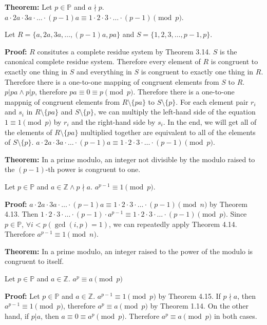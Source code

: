 \item \textbf{Theorem:} Let \(p \in \mathbb P\) and \(a \nmid p\). \(a \cdot 2a \cdot 3a \cdot \dots \cdot (p-1)a \equiv 1 \cdot 2 \cdot 3 \cdot \dots \cdot (p-1) \pmod p\).

Let \(R = \{a, 2a, 3a, \dots, (p-1)a, pa\}\) and \(S = \{1, 2, 3, \dots, p-1, p\}\).

\textbf{Proof:} \(R\) consitutes a complete residue system by Theorem 3.14. \(S\) is the canonical complete residue system. Therefore every element of \(R\) is congruent to exactly one thing in \(S\) and everything in \(S\) is congruent to exactly one thing in \(R\). Therefore there is a one-to-one mapping of congruent elements from \(S\) to \(R\). \(p|pa \wedge p|p\), therefore \(pa \equiv 0 \equiv p \pmod p\). Therefore there is a one-to-one mappnig of congruent elements from \(R \setminus \{pa\}\) to \(S \setminus \{p\}\). For each element pair \(r_i\) and \(s_i\) in \(R \setminus \{pa\}\) and \(S \setminus \{p\}\), we can multiply the left-hand side of the equation \(1 \equiv 1 \pmod p\) by \(r_i\) and the right-hand side by \(s_i\). In the end, we will get all of the elements of \(R \setminus \{pa\}\) multiplied together are equivalent to all of the elements of \(S \setminus \{p\}\). \(a \cdot 2a \cdot 3a \cdot \dots \cdot (p-1)a \equiv 1 \cdot 2 \cdot 3 \cdot \dots \cdot (p-1) \pmod p\). \qedhere

\item \textbf{Theorem:} In a prime modulo, an integer not divisible by the modulo raised to the \((p-1)\)-th power is congruent to one.

Let \(p \in \mathbb P\) and \(a \in \mathbb Z \wedge p \nmid a\). \(a^{p-1} \equiv 1 \pmod p\).

\textbf{Proof:} \(a \cdot 2a \cdot 3a \cdot \dots \cdot (p-1)a \equiv 1 \cdot 2 \cdot 3 \cdot \dots \cdot (p-1) \pmod n\) by Theorem 4.13. Then \(1 \cdot 2 \cdot 3 \cdot \dots \cdot (p-1) \cdot a^{p-1} \equiv 1 \cdot 2 \cdot 3 \cdot \dots \cdot (p-1) \pmod p\). Since \(p \in \mathbb P\), \(\forall i < p (\gcd(i, p) = 1)\), we can repeatedly apply Theorem 4.14. Therefore \(a^{p-1} \equiv 1 \pmod n\). \qedhere

\item \textbf{Theorem:} In a prime modulo, an integer raised to the power of the modulo is congruent to itself.

Let \(p \in \mathbb P\) and \(a \in \mathbb Z\). \(a^p \equiv a \pmod p\)

\textbf{Proof:} Let \(p \in \mathbb P\) and \(a \in \mathbb Z\). \(a^{p-1} \equiv 1 \pmod p\) by Theorem 4.15. If \(p \nmid a\), then \(a^{p-1} \equiv 1 \pmod p\), therefore \(a^p \equiv a \pmod p\) by Theorem 1.14. On the other hand, if \(p | a\), then \(a \equiv 0 \equiv a^p \pmod p\). Therefore \(a^p \equiv a \pmod p\) in both cases.

